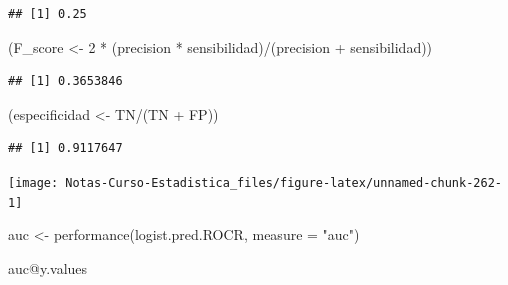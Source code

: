 \documentclass[
  12pt,
]{book}
\newenvironment{Shaded}{\begin{snugshade}}{\end{snugshade}}
\newcommand{\AttributeTok}[1]{\textcolor[rgb]{0.77,0.63,0.00}{#1}}
\newcommand{\DecValTok}[1]{\textcolor[rgb]{0.00,0.00,0.81}{#1}}
\newcommand{\FunctionTok}[1]{\textcolor[rgb]{0.00,0.00,0.00}{#1}}
\newcommand{\NormalTok}[1]{#1}
\newcommand{\OtherTok}[1]{\textcolor[rgb]{0.56,0.35,0.01}{#1}}
\newcommand{\SpecialCharTok}[1]{\textcolor[rgb]{0.00,0.00,0.00}{#1}}
\newcommand{\StringTok}[1]{\textcolor[rgb]{0.31,0.60,0.02}{#1}}
\theoremstyle{definition}
\theoremstyle{definition}
\theoremstyle{definition}
\theoremstyle{remark}
\begin{document}
\begin{verbatim}
## [1] 0.25
\end{verbatim}

\begin{Shaded}
\begin{Highlighting}[]
\NormalTok{(F\_score }\OtherTok{\textless{}{-}} \DecValTok{2} \SpecialCharTok{*}\NormalTok{ (precision }\SpecialCharTok{*}\NormalTok{ sensibilidad)}\SpecialCharTok{/}\NormalTok{(precision }\SpecialCharTok{+} 
\NormalTok{    sensibilidad))}
\end{Highlighting}
\end{Shaded}

\begin{verbatim}
## [1] 0.3653846
\end{verbatim}

\begin{Shaded}
\begin{Highlighting}[]
\NormalTok{(especificidad }\OtherTok{\textless{}{-}}\NormalTok{ TN}\SpecialCharTok{/}\NormalTok{(TN }\SpecialCharTok{+}\NormalTok{ FP))}
\end{Highlighting}
\end{Shaded}

\begin{verbatim}
## [1] 0.9117647
\end{verbatim}

\begin{Shaded}
\end{Shaded}

\begin{center}\texttt{[image: Notas-Curso-Estadistica\_files/figure-latex/unnamed-chunk-262-1]} \end{center}

\begin{Shaded}
\begin{Highlighting}[]
\NormalTok{auc }\OtherTok{\textless{}{-}} \FunctionTok{performance}\NormalTok{(logist.pred.ROCR, }\AttributeTok{measure =} \StringTok{"auc"}\NormalTok{)}

\NormalTok{auc}\SpecialCharTok{@}\NormalTok{y.values}
\end{Highlighting}
\end{Shaded}
\end{document}
